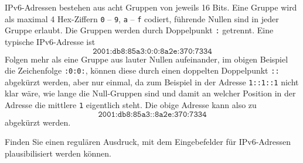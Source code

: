 IPv6-Adressen bestehen aus acht Gruppen von jeweils 16 Bits.
Eine Gruppe wird als maximal 4 Hex-Ziffern \texttt{0} -- \texttt{9},
\texttt{a} -- \texttt{f} codiert, führende Nullen sind in jeder Gruppe erlaubt.
Die Gruppen werden durch Doppelpunkt \texttt{:} getrennt.
Eine typische IPv6-Adresse ist
\[
\texttt{2001:db8:85a3:0:0:8a2e:370:7334}
\]
Folgen mehr als eine Gruppe aus lauter Nullen aufeinander, im obigen
Beispiel die Zeichenfolge \texttt{:0:0:}, können diese 
durch einen doppelten Doppelpunkt \texttt{::} abgekürzt werden, aber
nur einmal, da zum Beispiel in der Adresse \texttt{1::1::1} nicht klar wäre,
wie lange die Null-Gruppen
sind und damit an welcher Position in der Adresse die mittlere \texttt{1}
eigentlich steht.
Die obige Adresse kann also zu
\[
\texttt{2001:db8:85a3::8a2e:370:7334}
\]
abgekürzt werden.

Finden Sie einen regulären Ausdruck, mit dem Eingebefelder für IPv6-Adressen
plausibilisiert werden können.

